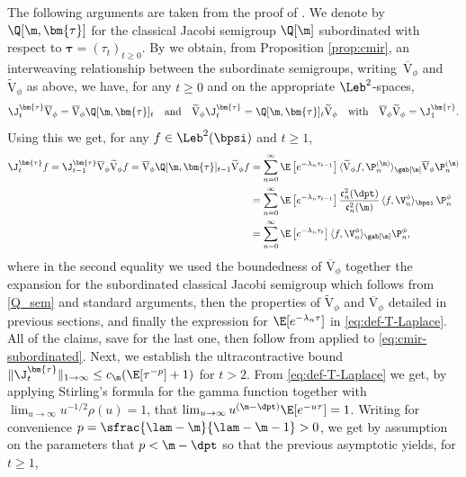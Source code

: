 The following arguments are taken from the proof of \cite[Prop.\,5]{Gateway}. We denote by $\Q[\m,\bm{\tau}]$ for the classical Jacobi semigroup $\Q[\m]$ subordinated with respect to $\bm{\tau} = (\tau_t)_{t \geq 0}$. By \cite[Th.\,3]{Patie-Miclo} we obtain, from Proposition \ref{prop:cmir}, an interweaving relationship between the subordinate semigroups, \ie writing~$\overline{\mathrm{V}}_\phi$ and~$\widetilde{\mathrm{V}}_\phi$ as above, we have, for any $t \geq 0$ and on the appropriate $\Leb^2$-spaces,
\begin{equation}
\label{eq:cmir-subordinated}
\J_t^{\bm{\tau}} \overline{\mathrm{V}}_\phi = \overline{\mathrm{V}}_\phi \Q[\m,\bm{\tau}]_t \quad \text{and} \quad \widetilde{\mathrm{V}}_\phi \J_t^{\bm{\tau}} = \Q[\m,\bm{\tau}]_t \widetilde{\mathrm{V}}_\phi \quad \text{with} \quad \overline{\mathrm{V}}_\phi\widetilde{\mathrm{V}}_\phi = \J_1^{\bm{\tau}}.
\end{equation}
Using this we get, for any $f \in \Leb^2(\bpsi)$ and $t \geq 1$,
\begin{align*}
\J_t^{\bm{\tau}} f = \J_{t-1}^{\bm{\tau}} \overline{\mathrm{V}}_\phi \widetilde{\mathrm{V}}_\phi f = \overline{\mathrm{V}}_\phi \Q[\m,\bm{\tau}]_{t-1} \widetilde{\mathrm{V}}_\phi f &= \sum_{n=0}^\infty \E\left[e^{-\lambda_n \tau_{t-1}}\right] \langle \widetilde{\mathrm{V}}_\phi f, \P_n^{(\m)} \rangle_{\gab[\m]} \overline{\mathrm{V}}_\phi \P_n^{(\m)} \\
&= \sum_{n=0}^\infty \E\left[e^{-\lambda_n \tau_{t-1}}\right] \frac{\mathfrak{c}_n^2(\dpt)}{\mathfrak{c}_n^2(\m)}\, \langle f, \V_n^\phi \rangle_{\bpsi}\, \P_n^\phi \\
&= \sum_{n=0}^\infty \E\left[e^{-\lambda_n \tau_t}\right] \langle f, \V_n^\phi \rangle_{\gab[\m]} \P_n^\phi,
\end{align*}
where in the second equality we used the boundedness of $\overline{\mathrm{V}}_\phi$ together the expansion for the subordinated classical Jacobi semigroup which follows from \eqref{Q_sem} and standard arguments, then the properties of $\widetilde{\mathrm{V}}_\phi$ and $\overline{\mathrm{V}}_\phi$ detailed in previous sections, and finally the expression for $\E[e^{-\lambda_n \tau}]$ in \eqref{eq:def-T-Laplace}. All of the claims, save for the last one, then follow from \cite[Ths.\,7, 24]{Patie-Miclo} applied to \eqref{eq:cmir-subordinated}. Next, we establish the ultracontractive bound $\|\J_t^{\bm{\tau}}\|_{1\to\infty} \leq c_\m(\E[\tau^{-p}]+1)$ for $t > 2$. From \eqref{eq:def-T-Laplace} we get, by applying Stirling's formula for the gamma function together with $\lim_{u \to \infty} u^{-1/2}\rho(u) = 1$, that $\lim_{u \to \infty} u^{(\m-\dpt)} \E[e^{-u \tau}] = 1$. Writing for convenience $p = \sfrac{\lam-\m}{\lam-\m-1} > 0$, we get by assumption on the parameters that $p < \m-\dpt$ so that the previous asymptotic yields, for $t \geq 1$,
